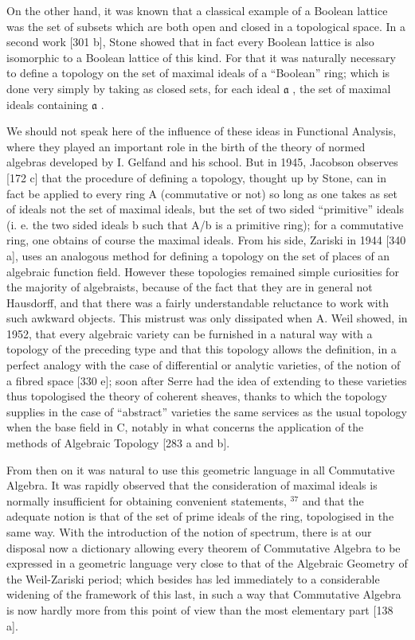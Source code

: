 On the other hand, it was known that a classical example of a Boolean lattice was the set of subsets which are both open and closed in a topological space. In a second work {[}301 b{]}, Stone showed that in fact every Boolean lattice is also isomorphic to a Boolean lattice of this kind. For that it was naturally necessary to define a topology on the set of maximal ideals of a ``Boolean'' ring; which is done very simply by taking as closed sets, for each ideal \(\mathfrak{a}\) , the set of maximal ideals containing \(\mathfrak{a}\) .

We should not speak here of the influence of these ideas in Functional Analysis, where they played an important role in the birth of the theory of normed algebras developed by I. Gelfand and his school. But in 1945, Jacobson observes {[}172 c{]} that the procedure of defining a topology, thought up by Stone, can in fact be applied to every ring A (commutative or not) so long as one takes as set of ideals not the set of maximal ideals, but the set of two sided ``primitive'' ideals (i. e. the two sided ideals b such that A/b is a primitive ring); for a commutative ring, one obtains of course the maximal ideals. From his side, Zariski in 1944 {[}340 a{]}, uses an analogous method for defining a topology on the set of places of an algebraic function field. However these topologies remained simple curiosities for the majority of algebraists, because of the fact that they are in general not Hausdorff, and that there was a fairly understandable reluctance to work with such awkward objects. This mistrust was only dissipated when A. Weil showed, in 1952, that every algebraic variety can be furnished in a natural way with a topology of the preceding type and that this topology allows the definition, in a perfect analogy with the case of differential or analytic varieties, of the notion of a fibred space {[}330 e{]}; soon after Serre had the idea of extending to these varieties thus topologised the theory of coherent sheaves, thanks to which the topology supplies in the case of ``abstract'' varieties the same services as the usual topology when the base field in C, notably in what concerns the application of the methods of Algebraic Topology {[}283 a and b{]}.

From then on it was natural to use this geometric language in all Commutative Algebra. It was rapidly observed that the consideration of maximal ideals is normally insufficient for obtaining convenient statements, \(^{37}\) and that the adequate notion is that of the set of prime ideals of the ring, topologised in the same way. With the introduction of the notion of spectrum, there is at our disposal now a dictionary allowing every theorem of Commutative Algebra to be expressed in a geometric language very close to that of the Algebraic Geometry of the Weil-Zariski period; which besides has led immediately to a considerable widening of the framework of this last, in such a way that Commutative Algebra is now hardly more from this point of view than the most elementary part {[}138 a{]}.

